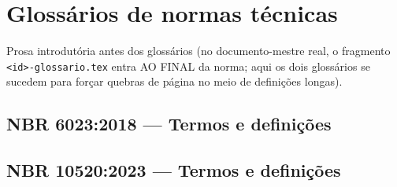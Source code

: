 \documentclass[11pt,a5paper,twoside,openany]{book}
\begin{document}
\TOCAcessivel
\mainmatter

\chapter{Glossários de normas técnicas}

Prosa introdutória antes dos glossários (no documento-mestre real, o
fragmento \texttt{<id>-glossario.tex} entra AO FINAL da norma; aqui
os dois glossários se sucedem para forçar quebras de página no meio
de definições longas).

\section{NBR 6023:2018 — Termos e definições}


\section{NBR 10520:2023 — Termos e definições}

\end{document}
